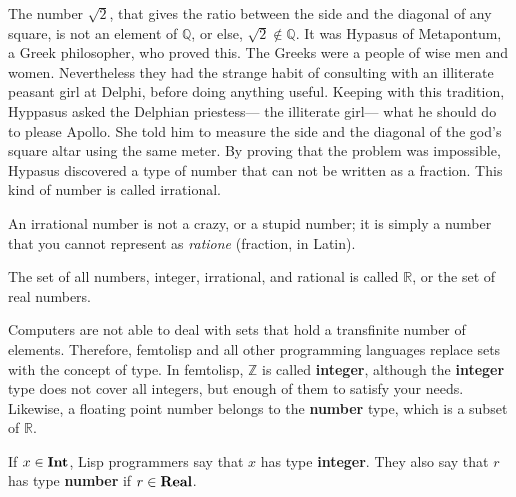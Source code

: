 \documentclass[a4paper,12pt]{book}
\begin{document}
The number $\sqrt 2$, that gives the ratio
between the side and the diagonal of any square, is not an element of $\mathbb{Q}$,
or else, $\sqrt 2 \notin  \mathbb{Q}$. It was Hypasus of Metapontum, a Greek philosopher,
who proved this. The Greeks were a people of wise men and women. Nevertheless they
had the strange habit of consulting with an illiterate peasant girl at Delphi,
before doing anything useful. Keeping with this tradition, Hyppasus  asked
the Delphian priestess--- the illiterate girl--- what he should do to please Apollo.
She told him to measure  the side and the diagonal of the god's square
altar using the same meter. By proving
that the problem was impossible, Hypasus discovered a type of number that can not be
written as a fraction. This kind of number is called irrational.

An irrational number
is not a crazy, or a stupid number; it is simply a number that you cannot represent
as {\em ratione} (fraction, in Latin).

The set of all numbers, integer, 
irrational, and rational is called $\mathbb{R}$, or
the set of real numbers. 

Computers are not able to deal
with sets that hold a transfinite number of
elements. Therefore, femtolisp and
all other programming languages
replace sets with the concept of type.
In femtolisp, $\mathbb{Z}$ is 
called {\bf integer}, although
the {\bf integer} type does not cover all integers, 
but enough of them to satisfy
your needs. Likewise, a floating point
number belongs to the {\bf number} type, 
which is a subset of $\mathbb{R}$.


If $x\in{\bf Int}$, Lisp programmers say 
that $x$ has 
type\label{type:definition}  {\bf integer}. 
They also say that $r$ has 
type {\bf number} if $r\in {\bf Real}$.
\end{document}
